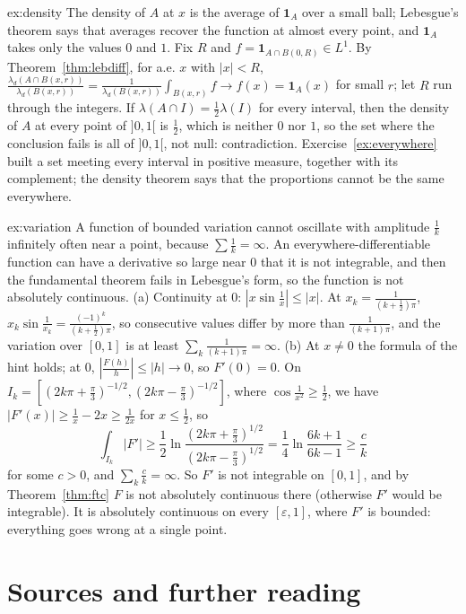 \begin{solution}{ex:density}
\idea The density of $A$ at $x$ is the average of $\mathbf 1_A$ over a small ball; Lebesgue's theorem says that averages recover the function at almost every point, and $\mathbf 1_A$ takes only the values $0$
and $1$.
\writeup Fix $R$ and $f=\mathbf 1_{A\cap B(0,R)}\in L^1$. By Theorem~\ref{thm:lebdiff}, for a.e. $x$ with $|x|<R$, $\frac{\lambda_d(A\cap B(x,r))}{\lambda_d(B(x,r))}=\frac1{\lambda_d(B(x,r))}\int_{B(x,r)}f\to f(x)=\mathbf 1_A(x)$ for small $r$; let $R$ run
through the integers. If $\lambda(A\cap I)=\frac12\lambda(I)$ for every interval, then the density of $A$ at every point of $]0,1[$ is $\frac12$, which is neither $0$ nor $1$, so the set where the conclusion fails is
all of $]0,1[$, not null: contradiction. Exercise~\ref{ex:everywhere} built a set meeting every interval in positive measure, together with its complement; the density theorem says that the proportions cannot be
the same everywhere.
\end{solution}

\begin{solution}{ex:variation}
\idea A function of bounded variation cannot oscillate with amplitude $\frac1k$ infinitely often near a point, because $\sum\frac1k=\infty$. An everywhere-differentiable function can have a derivative so large
near $0$ that it is not integrable, and then the fundamental theorem fails in Lebesgue's form, so the function is not absolutely continuous.
\writeup (a) Continuity at $0$: $|x\sin\frac1x|\le|x|$. At $x_k=\frac1{(k+\frac12)\pi}$, $x_k\sin\frac1{x_k}=\frac{(-1)^k}{(k+\frac12)\pi}$, so consecutive values differ by more than $\frac1{(k+1)\pi}$, and the variation over
$[0,1]$ is at least $\sum_k\frac1{(k+1)\pi}=\infty$. (b) At $x\ne0$ the formula of the hint holds; at $0$, $|\frac{F(h)}h|\le|h|\to0$, so $F'(0)=0$. On $I_k=[(2k\pi+\frac\pi3)^{-1/2},(2k\pi-\frac\pi3)^{-1/2}]$, where
$\cos\frac1{x^2}\ge\frac12$, we have $|F'(x)|\ge\frac1x-2x\ge\frac1{2x}$ for $x\le\frac12$, so
\[\int_{I_k}|F'|\ge\frac12\ln\frac{(2k\pi+\frac\pi3)^{1/2}}{(2k\pi-\frac\pi3)^{1/2}}=\frac14\ln\frac{6k+1}{6k-1}\ge\frac c k\]
for some $c>0$, and $\sum_k\frac ck=\infty$. So $F'$ is not integrable on $[0,1]$, and by Theorem~\ref{thm:ftc} $F$ is not absolutely continuous there (otherwise $F'$ would be integrable). It is absolutely continuous on every
$[\varepsilon,1]$, where $F'$ is bounded: everything goes wrong at a single point.
\end{solution}

\section*{Sources and further reading}

